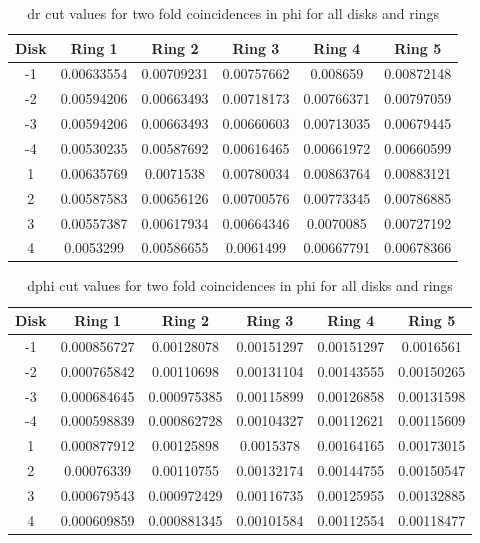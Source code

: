 \begin{table}[htbp]
  \centering
  \caption{dr cut values for two fold coincidences in phi for all disks and rings}
  \label{tab:disk_values}
  \begin{tabular}{cccccc}
    \textbf{Disk} & \textbf{Ring 1} & \textbf{Ring 2} & \textbf{Ring 3} & \textbf{Ring 4} & \textbf{Ring 5} \\
    \hline
    -1 & 0.00633554 & 0.00709231 & 0.00757662 & 0.008659   & 0.00872148 \\
    -2 & 0.00594206 & 0.00663493 & 0.00718173 & 0.00766371 & 0.00797059 \\
    -3 & 0.00594206 & 0.00663493 & 0.00660603 & 0.00713035 & 0.00679445 \\
    -4 & 0.00530235 & 0.00587692 & 0.00616465 & 0.00661972 & 0.00660599 \\
    1  & 0.00635769 & 0.0071538  & 0.00780034 & 0.00863764 & 0.00883121 \\
    2  & 0.00587583 & 0.00656126 & 0.00700576 & 0.00773345 & 0.00786885 \\
    3  & 0.00557387 & 0.00617934 & 0.00664346 & 0.0070085  & 0.00727192 \\
    4  & 0.0053299  & 0.00586655 & 0.0061499  & 0.00667791 & 0.00678366 \\
  \end{tabular}
\end{table}



\begin{table}[htbp]
  \centering
  \caption{dphi cut values for two fold coincidences in phi for all disks and rings}
  \label{tab:mdphi_cuts_values}
  \begin{tabular}{cccccc}
    \textbf{Disk} & \textbf{Ring 1} & \textbf{Ring 2} & \textbf{Ring 3} & \textbf{Ring 4} & \textbf{Ring 5} \\
    \hline
    -1 & 0.000856727  & 0.00128078   & 0.00151297   & 0.00151297   & 0.0016561    \\
    -2 & 0.000765842  & 0.00110698   & 0.00131104   & 0.00143555   & 0.00150265   \\
    -3 & 0.000684645  & 0.000975385  & 0.00115899   & 0.00126858   & 0.00131598   \\
    -4 & 0.000598839  & 0.000862728  & 0.00104327   & 0.00112621   & 0.00115609   \\
    1  & 0.000877912  & 0.00125898   & 0.0015378    & 0.00164165   & 0.00173015   \\
    2  & 0.00076339   & 0.00110755   & 0.00132174   & 0.00144755   & 0.00150547   \\
    3  & 0.000679543  & 0.000972429  & 0.00116735   & 0.00125955   & 0.00132885   \\
    4  & 0.000609859  & 0.000881345  & 0.00101584   & 0.00112554   & 0.00118477   \\
  \end{tabular}
\end{table}

